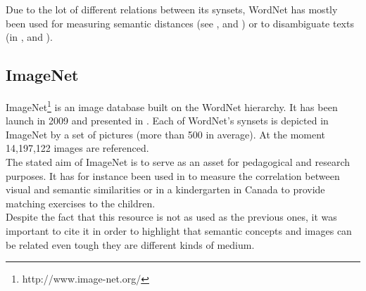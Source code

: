 Due to the lot of different relations between its synsets, WordNet has mostly been used for measuring semantic distances (see \cite{budanitsky2001semantic}, \cite{richardson1994using} and \cite{agirre2009study}) or to disambiguate texts (in \cite{resnik1995disambiguating}, \cite{voorhees1993using} and \cite{banerjee2002adapted}).\\

\subsection{ImageNet} %
\label{sub:imagenet}

ImageNet\footnote{http://www.image-net.org/} is an image database built on the WordNet hierarchy. It has been launch in 2009 and presented in \cite{deng2009imagenet}. Each of WordNet's synsets is depicted in ImageNet by a set of pictures (more than 500 in average). At the moment 14,197,122 images are referenced.\\

The stated aim of ImageNet is to serve as an asset for pedagogical and research purposes. It has for instance been used in \cite{deselaers2011visual} to measure the correlation between visual and semantic similarities or in a kindergarten in Canada to provide matching exercises to the children.\\

Despite the fact that this resource is not as used as the previous ones, it was important to cite it in order to highlight that semantic concepts and images can be related even tough they are different kinds of medium.  

